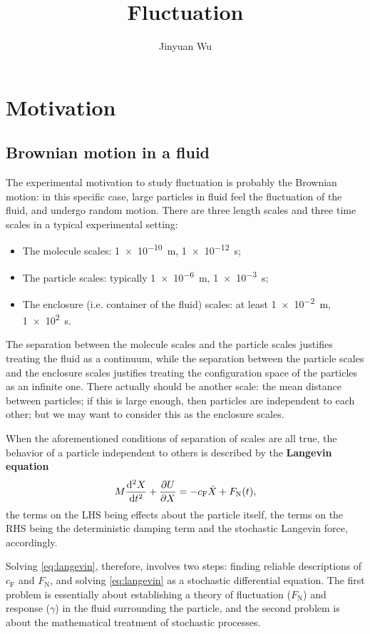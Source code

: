 \documentclass[hyperref, a4paper]{article}
\title{Fluctuation}
\author{Jinyuan Wu}
\newcommand*{\concept}[1]{{\textbf{#1}}}
\begin{document}
\maketitle

\section{Motivation}

\subsection{Brownian motion in a fluid}

The experimental motivation to study fluctuation is 
probably the Brownian motion: 
in this specific case, 
large particles in fluid feel the fluctuation of the fluid,
and undergo random motion.
There are three length scales and three time scales 
in a typical experimental setting:
\begin{itemize}
    \item The molecule scales: \SI{1e-10}{m}, \SI{1e-12}{s};
    \item The particle scales: typically \SI{1e-6}{m}, \SI{1e-3}{s};
    \item The enclosure (i.e. container of the fluid) scales: 
    at least \SI{1e-2}{m}, \SI{1e2}{s}.
\end{itemize}
The separation between the molecule scales and the particle scales 
justifies treating the fluid as a continuum,
while the separation between the particle scales 
and the enclosure scales 
justifies treating the configuration space of the particles 
as an infinite one.
There actually should be another scale: 
the mean distance between particles;
if this is large enough, 
then particles are independent to each other; 
but we may want to consider this as the enclosure scales.

When the aforementioned conditions of separation of scales are all true, 
the behavior of a particle independent to others is described 
by the \concept{Langevin equation} 
\begin{equation}
    M \dv[2]{X}{t} + \pdv{U}{X} = - c_{\text{F}} \dot{X} + F_{\text{N}}(t),
    \label{eq:langevin}
\end{equation}
the terms on the LHS being effects about the particle itself,
the terms on the RHS being the deterministic damping term 
and the stochastic Langevin force, accordingly.

Solving \eqref{eq:langevin}, therefore, involves two steps:
finding reliable descriptions of $c_{\text{F}}$ and $F_{\text{N}}$,
and solving \eqref{eq:langevin} as a stochastic differential equation.
The first problem is essentially about establishing a theory 
of fluctuation ($F_{\text{N}}$) and response ($\gamma$) 
in the fluid surrounding the particle,
and the second problem is about the mathematical treatment 
of stochastic processes.
\end{document}
